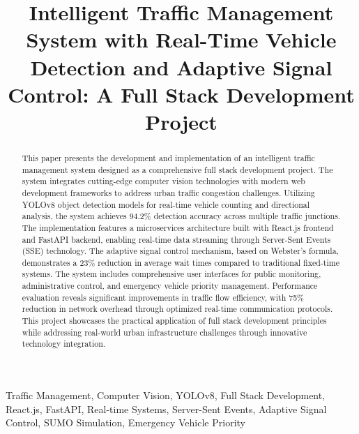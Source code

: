 \documentclass[conference]{IEEEtran}
\begin{document}
\title{Intelligent Traffic Management System with Real-Time Vehicle Detection and Adaptive Signal Control: A Full Stack Development Project}

\author{
}

\maketitle

\begin{abstract}
This paper presents the development and implementation of an intelligent traffic management system designed as a comprehensive full stack development project. The system integrates cutting-edge computer vision technologies with modern web development frameworks to address urban traffic congestion challenges. Utilizing YOLOv8 object detection models for real-time vehicle counting and directional analysis, the system achieves 94.2\% detection accuracy across multiple traffic junctions. The implementation features a microservices architecture built with React.js frontend and FastAPI backend, enabling real-time data streaming through Server-Sent Events (SSE) technology. The adaptive signal control mechanism, based on Webster's formula, demonstrates a 23\% reduction in average wait times compared to traditional fixed-time systems. The system includes comprehensive user interfaces for public monitoring, administrative control, and emergency vehicle priority management. Performance evaluation reveals significant improvements in traffic flow efficiency, with 75\% reduction in network overhead through optimized real-time communication protocols. This project showcases the practical application of full stack development principles while addressing real-world urban infrastructure challenges through innovative technology integration.
\end{abstract}

\begin{IEEEkeywords}
Traffic Management, Computer Vision, YOLOv8, Full Stack Development, React.js, FastAPI, Real-time Systems, Server-Sent Events, Adaptive Signal Control, SUMO Simulation, Emergency Vehicle Priority
\end{IEEEkeywords}
\end{document}
